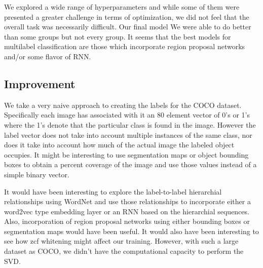 \documentclass[12pt,journal,compsoc]{IEEEtran}
\begin{document}


We explored a wide range of hyperparameters and while some of them were presented a greater challenge in terms of optimization, we did not feel that the overall task was necessarily difficult. Our final model We were able to do better than some groups but not every group. It seems that the best models for multilabel classification are those which incorporate region proposal networks and/or some flavor of RNN.

\subsection{Improvement}


We take a very naive approach to creating the labels for the COCO dataset.  Specifically each image has associated with it an 80 element vector of 0's or 1's where the 1's denote that the particular class is found in the image.  However the label vector does not take into account multiple instances of the same class, nor does it take into account how much of the actual image the labeled object occupies.  It might be interesting to use segmentation maps or object bounding boxes to obtain a percent coverage of the image and use those values instead of a simple binary vector.


It would have been interesting to explore the label-to-label hierarchial relationships using WordNet and use those relationships to incorporate either a word2vec type embedding layer or an RNN based on the hierarchial sequences.  Also, incorporation of region proposal networks using either bounding boxes or segmentation maps would have been useful.  It would also have been interesting to see how zcf whitening might affect our training.  However, with such a large dataset as COCO, we didn't have the computational capacity to perform the SVD.
\end{document}
